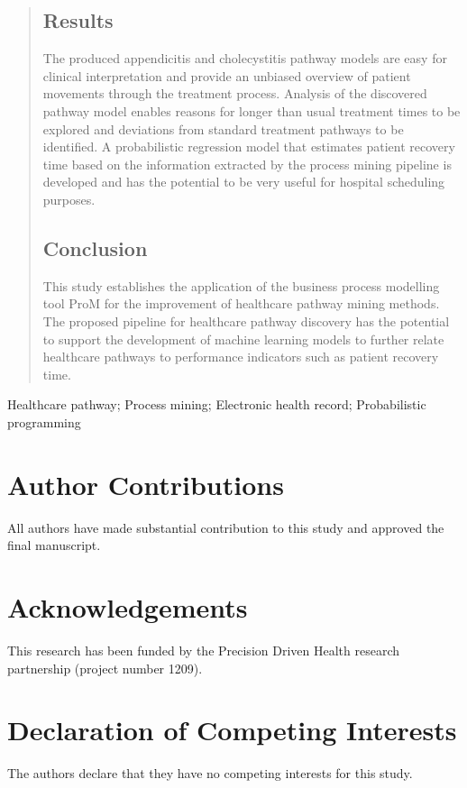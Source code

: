 \documentclass{elsarticle}
\begin{document}
\begin{frontmatter}
\begin{abstract}
\subsection*{Results}
The produced appendicitis and cholecystitis 
pathway models are
easy for clinical interpretation and provide an unbiased overview of patient movements through the treatment process. Analysis of the discovered pathway model enables reasons for longer than usual treatment times to be explored and deviations from standard treatment pathways to be identified. A probabilistic regression model that estimates patient recovery time based on the information extracted by the process mining pipeline is developed and has the potential to be very useful for hospital scheduling purposes.

\subsection*{Conclusion}
This study establishes the application of the business process modelling tool ProM for the improvement of healthcare pathway mining methods. 
The proposed pipeline for healthcare pathway discovery  has the potential to support the development of machine learning models to further relate healthcare pathways to performance indicators such as patient recovery time. 

\end{abstract}

\begin{keyword}
Healthcare pathway; Process mining; Electronic health record; Probabilistic programming
\end{keyword}

\end{frontmatter}

\linenumbers



\section*{Author Contributions}
All authors have made substantial contribution to this study and approved the final manuscript.

\section*{Acknowledgements}
This research has been funded by the Precision Driven Health research partnership (project number 1209).

\section*{Declaration of Competing Interests}
The authors declare that they have no competing interests for this study.



\begin{appendix}

\end{appendix}
\end{document}
